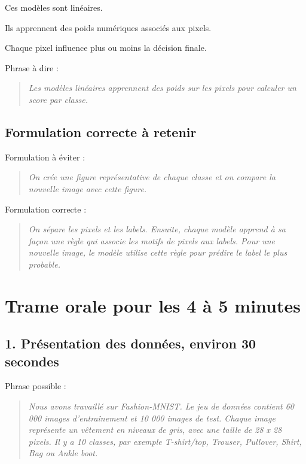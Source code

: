 \documentclass[11pt,a4paper]{article}
\begin{document}
Ces modèles sont linéaires.

Ils apprennent des poids numériques associés aux pixels.

Chaque pixel influence plus ou moins la décision finale.

Phrase à dire :

\begin{quote}
\itshape Les modèles linéaires apprennent des poids sur les pixels pour calculer un score par classe.
\end{quote}

\subsection{Formulation correcte à retenir}

Formulation à éviter :

\begin{quote}
\itshape On crée une figure représentative de chaque classe et on compare la nouvelle image avec cette figure.
\end{quote}

Formulation correcte :

\begin{quote}
\itshape On sépare les pixels et les labels. Ensuite, chaque modèle apprend à sa façon une règle qui associe les motifs de pixels aux labels. Pour une nouvelle image, le modèle utilise cette règle pour prédire le label le plus probable.
\end{quote}

\section{Trame orale pour les 4 à 5 minutes}

\subsection{1. Présentation des données, environ 30 secondes}

Phrase possible :

\begin{quote}
\itshape Nous avons travaillé sur Fashion-MNIST. Le jeu de données contient 60 000 images d'entraînement et 10 000 images de test. Chaque image représente un vêtement en niveaux de gris, avec une taille de 28 x 28 pixels. Il y a 10 classes, par exemple T-shirt/top, Trouser, Pullover, Shirt, Bag ou Ankle boot.
\end{quote}
\end{document}
